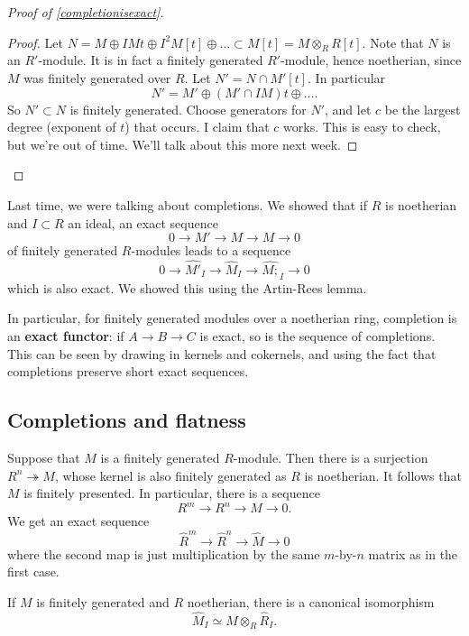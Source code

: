 \begin{proof}[Proof of \cref{completionisexact}]
\begin{proof}
Let $N = M \oplus  IM t \oplus I^2 M [t] \oplus \dots \subset M[t] = M
\otimes_R R[t]$. Note that $N$ is an $R'$-module. It is in fact a finitely
generated $R'$-module, hence noetherian, since $M$ was finitely generated over
$R$. Let $N' = N \cap M'[t]$. In particular
\[ N' = M' \oplus (M' \cap IM ) t \oplus \dots.  \]
So $N' \subset N$ is finitely generated. Choose generators for $N'$, and let
$c$ be the largest degree (exponent of $t$) that occurs.
I claim that $c$ works.  This is easy to check, but we're out of time. We'll
talk about this more next week. 
\end{proof} 
\end{proof} 

Last time, we were talking about completions. We showed that if $R$ is
noetherian and $I \subset R$ an ideal, an exact sequence
\[ 0 \to M' \to M \to M \to 0   \]
of finitely generated $R$-modules leads to a sequence
\[ 0 \to \hat{M'}_I \to \hat{M}_I \to \hat{M;}_I \to 0  \]
which is also exact. We showed this using the Artin-Rees lemma.

\begin{remark}
In particular, for finitely generated modules over a noetherian ring, completion is an \textbf{exact functor}: if $A \to B \to C$ is
exact, so is the sequence of completions. This can be seen by drawing in
kernels and cokernels, and using the fact that completions preserve short
exact sequences. 
\end{remark}

\subsection{Completions and flatness}

Suppose that $M$ is a finitely generated $R$-module. Then there is a surjection $R^n
\twoheadrightarrow M$, whose kernel is also finitely generated as $R$ is
noetherian. It follows that
$M$ is finitely presented. In particular, there is a sequence
\[ R^m \to R^n \to M \to 0.  \]
We get an exact sequence
\[ \hat{R}^m \to \hat{R}^n \to \hat{M} \to 0  \]
where the second map is just multiplication by the same $m$-by-$n$ matrix as in
the first case.

\begin{corollary} 
If $M$ is finitely generated and $R$ noetherian, there is a canonical isomorphism
\[ \hat{M}_I \simeq M \otimes_R \hat{R}_I.  \]
\end{corollary} 

